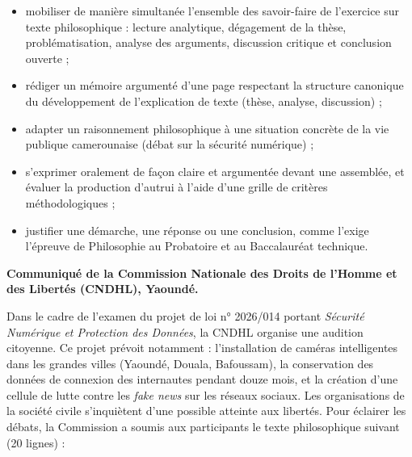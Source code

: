 \documentclass[11pt]{article}
\newcounter{popsec}
\newcounter{popsub}
\newcommand{\courssub}[1]{%
  \stepcounter{popsub}%
  \par\vspace{9pt}\noindent{\popxbold\fontsize{11.5}{13}\selectfont\color{popink}{\color{poporange}\thepopsec.\thepopsub}\hspace{6pt}#1}\par\nopagebreak\vspace{4pt}
}
\begin{document}
\begin{itemize}
\item mobiliser de manière simultanée l'ensemble des savoir-faire de l'exercice sur texte philosophique : lecture analytique, dégagement de la thèse, problématisation, analyse des arguments, discussion critique et conclusion ouverte ;
\item rédiger un mémoire argumenté d'une page respectant la structure canonique du développement de l'explication de texte (thèse, analyse, discussion) ;
\item adapter un raisonnement philosophique à une situation concrète de la vie publique camerounaise (débat sur la sécurité numérique) ;
\item s'exprimer oralement de façon claire et argumentée devant une assemblée, et évaluer la production d'autrui à l'aide d'une grille de critères méthodologiques ;
\item justifier une démarche, une réponse ou une conclusion, comme l'exige l'épreuve de Philosophie au Probatoire et au Baccalauréat technique.
\end{itemize}

\courssub{Situation}

\textbf{Communiqué de la Commission Nationale des Droits de l'Homme et des Libertés (CNDHL), Yaoundé.}

Dans le cadre de l'examen du projet de loi n° 2026/014 portant \emph{Sécurité Numérique et Protection des Données}, la CNDHL organise une audition citoyenne. Ce projet prévoit notamment : l'installation de caméras intelligentes dans les grandes villes (Yaoundé, Douala, Bafoussam), la conservation des données de connexion des internautes pendant douze mois, et la création d'une cellule de lutte contre les \emph{fake news} sur les réseaux sociaux. Les organisations de la société civile s'inquiètent d'une possible atteinte aux libertés. Pour éclairer les débats, la Commission a soumis aux participants le texte philosophique suivant (20 lignes) :
\end{document}
